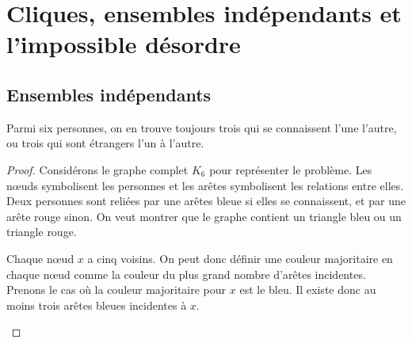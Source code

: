 \section{Cliques, ensembles indépendants et l'impossible désordre}

\subsection{Ensembles indépendants}

\begin{mytheo}  \label{ami1}
  Parmi six personnes, on en trouve toujours trois qui se connaissent l'une l'autre, ou trois qui sont étrangers l'un à l'autre.
  \begin{proof}
     Considérons le graphe complet $K_6$ pour représenter le problème.
     Les nœuds symbolisent les personnes et les arêtes symbolisent les relations entre elles.
     Deux personnes sont reliées par une arêtes bleue si elles se connaissent, et par une arête rouge sinon.
     On veut montrer que le graphe contient un triangle bleu ou un triangle rouge.

     Chaque nœud $x$ a cinq voisins. On peut donc définir une couleur majoritaire en chaque nœud comme la couleur du plus grand nombre d'arêtes incidentes. Prenons le cas où la couleur majoritaire pour $x$ est le bleu. Il existe donc au moins trois arêtes bleues incidentes à $x$.

   \begin{figure} [!h]
   \centering
	\end{figure}


\end{proof}
\end{mytheo}
